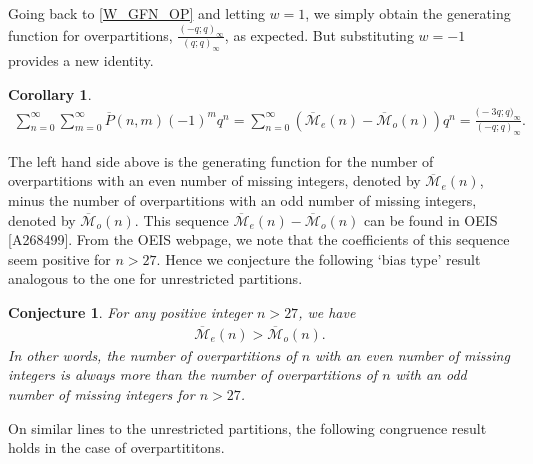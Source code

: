 \documentclass[12pt,reqno]{amsart}
\renewcommand{\(}{\left\(}
\renewcommand{\)}{\right\)}
\renewcommand{\[}{\left\[}
\renewcommand{\]}{\right\]}
\numberwithin{equation}{section}
\theoremstyle{plain}
\newtheorem{conjecture}[theorem]{Conjecture}
\newtheorem{corollary}[theorem]{Corollary}
\begin{document}
Going back to \eqref{W_GFN_OP} and letting $w=1$, we simply obtain the generating function for overpartitions, $\frac{(-q;q)_{\infty}}{(q;q)_{\infty}}$, as expected. But substituting $w=-1$ provides a new identity.
\begin{corollary}
\begin{align*}
\sum_{n=0}^{\infty}\sum_{m=0}^{\infty} \overline{P}(n,m)(-1)^mq^n=\sum_{n=0}^{\infty}\left(\overline{\mathcal{M}}_e(n)-\overline{\mathcal{M}}_o(n)\right)q^n=\frac{\big(-3q;q\big)_{\infty}}{(-q;q)_{\infty}}. \label{A268499}
\end{align*}
\end{corollary}
The left hand side above is the generating function for the number of overpartitions with an even number of missing integers, denoted by $\overline{\mathcal{M}}_e(n)$, minus the number of overpartitions with an odd number of missing integers, denoted by $\overline{\mathcal{M}}_o(n)$. This sequence $\overline{\mathcal{M}}_e(n) - \overline{\mathcal{M}}_o(n)$ can be found in OEIS [A268499].
From the OEIS webpage, we note that the coefficients of this sequence seem positive for $n>27$. Hence we conjecture the following `bias type' result analogous to the one for unrestricted partitions.
\begin{conjecture} For any positive integer $n>27$, we have 
\begin{align*}
\overline{\mathcal{M}}_e(n)>\overline{\mathcal{M}}_o(n).
\end{align*}
In other words, the number of overpartitions of $n$ with an even number of missing integers is always more than the number of overpartitions of $n$ with an odd number of missing integers for $n>27$.
\end{conjecture}
On similar lines to the unrestricted partitions, the following congruence result holds in the case of overpartititons.
\end{document}
